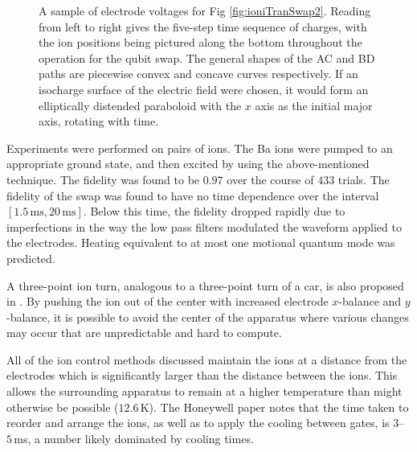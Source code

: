 \documentclass[12pt,a4paper]{amsart}
\numberwithin{equation}{section}
\theoremstyle{plain}
\theoremstyle{definition}
\begin{document}
\begin{figure}
{}
    \caption{A sample of electrode voltages for Fig \ref{fig:ioniTranSwap2}. Reading from left to right gives the five-step time sequence of charges, with the ion positions being pictured along the bottom throughout the operation for the qubit swap. The general shapes of the AC and BD paths are piecewise convex and concave curves respectively. If an isocharge surface of the electric field were chosen, it would form an elliptically distended paraboloid with the $x$ axis as the initial major axis, rotating with time.
    \cite{ioniTranSwap}}
    \label{fig:ioniTranSwap3}
\end{figure}

Experiments were performed on pairs of ions. The Ba ions were pumped to an appropriate ground state, and then excited by using the above-mentioned technique. The fidelity was found to be $0.97$ over the course of $433$ trials. The fidelity of the swap was found to have no time dependence over the interval $[1.5\,\mathrm{ms},20\,\mathrm{ms}]$. Below this time, the fidelity dropped rapidly due to imperfections in the way the low pass filters modulated the waveform applied to the electrodes. Heating equivalent to at most one motional quantum mode was predicted.

A three-point ion turn, analogous to a three-point turn of a car, is also proposed in \cite{ioniTranSwap}. By pushing the ion out of the center with increased electrode $x$-balance and $y$-balance, it is possible to avoid the center of the apparatus where various changes may occur that are unpredictable and hard to compute.

All of the ion control methods discussed maintain the ions at a distance from the electrodes which is significantly larger than the distance between the ions. This allows the surrounding apparatus to remain at a higher temperature than might otherwise be possible ($12.6\,$K). The Honeywell paper notes that the time taken to reorder and arrange the ions, as well as to apply the cooling between gates, is $3$--$5\,$ms, a number likely dominated by cooling times.
\end{document}
